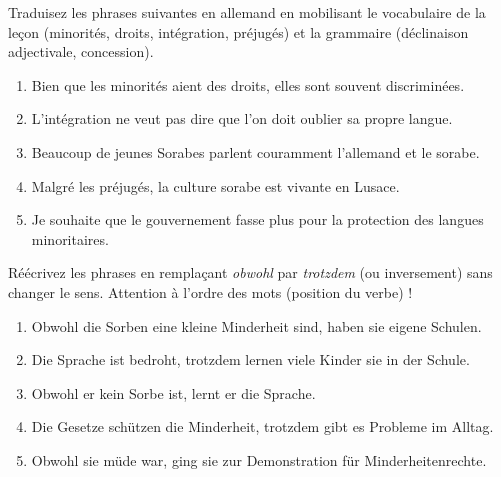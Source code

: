 \documentclass[11pt]{article}
\newcounter{popsec}
\newcounter{popsub}
\newcommand{\courssub}[1]{%
  \stepcounter{popsub}%
  \par\vspace{9pt}\noindent{\popxbold\fontsize{11.5}{13}\selectfont\color{popink}{\color{poporange}\thepopsec.\thepopsub}\hspace{6pt}#1}\par\nopagebreak\vspace{4pt}
}
\begin{document}
\courssub{Je m'entraîne}

\begin{exercice}
Traduisez les phrases suivantes en allemand en mobilisant le vocabulaire de la leçon (minorités, droits, intégration, préjugés) et la grammaire (déclinaison adjectivale, concession).
\begin{enumerate}
    \item Bien que les minorités aient des droits, elles sont souvent discriminées.
    \item L'intégration ne veut pas dire que l'on doit oublier sa propre langue.
    \item Beaucoup de jeunes Sorabes parlent couramment l'allemand et le sorabe.
    \item Malgré les préjugés, la culture sorabe est vivante en Lusace.
    \item Je souhaite que le gouvernement fasse plus pour la protection des langues minoritaires.
\end{enumerate}
\end{exercice}

\begin{exercice}
Réécrivez les phrases en remplaçant \emph{obwohl} par \emph{trotzdem} (ou inversement) sans changer le sens. Attention à l'ordre des mots (position du verbe) !
\begin{enumerate}
    \item Obwohl die Sorben eine kleine Minderheit sind, haben sie eigene Schulen.
    \item Die Sprache ist bedroht, trotzdem lernen viele Kinder sie in der Schule.
    \item Obwohl er kein Sorbe ist, lernt er die Sprache.
    \item Die Gesetze schützen die Minderheit, trotzdem gibt es Probleme im Alltag.
    \item Obwohl sie müde war, ging sie zur Demonstration für Minderheitenrechte.
\end{enumerate}
\end{exercice}
\end{document}
